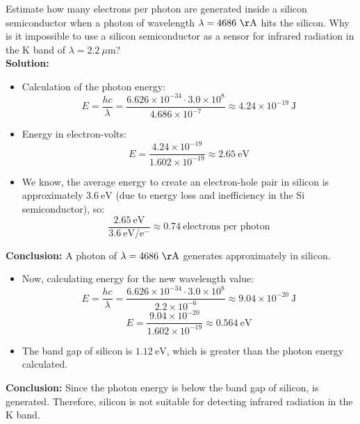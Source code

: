 \documentclass[12pt,a4paper]{article}
\begin{document}
\subsubsection*{}
Estimate how many electrons per photon are generated inside a silicon semiconductor when a photon of wavelength $\lambda = 4686\ \mathrm{\AA}$ hits the silicon. 
Why is it impossible to use a silicon semiconductor as a sensor for infrared radiation in the K band of $\lambda = 2.2\ \mu\mathrm{m}$?
\\ \textbf{Solution:} \\
\begin{itemize}
  
  \item Calculation of the photon energy:
  \[
  E = \frac{hc}{\lambda} = \frac{6.626 \times 10^{-34} \cdot 3.0 \times 10^8}{4.686 \times 10^{-7}} \approx 4.24 \times 10^{-19}\ \mathrm{J}
  \]
  
  \item Energy in electron-volts:
  \[
  E = \frac{4.24 \times 10^{-19}}{1.602 \times 10^{-19}} \approx 2.65\ \mathrm{eV}
  \]
  
  \item We know, the average energy to create an electron-hole pair in silicon is approximately $3.6\ \mathrm{eV}$ (due to energy loss and inefficiency in the Si semiconductor), so:
  \[
  \frac{2.65\ \mathrm{eV}}{3.6\ \mathrm{eV/e^-}} \approx 0.74\ \text{electrons per photon}
  \]
\end{itemize}
\textbf{Conclusion:} A photon of $\lambda = 4686\ \mathrm{\AA}$ generates approximately  in silicon.

\begin{itemize}

  \item Now, calculating energy for the new wavelength value:
  \[
  E = \frac{hc}{\lambda} = \frac{6.626 \times 10^{-34} \cdot 3.0 \times 10^8}{2.2 \times 10^{-6}} \approx 9.04 \times 10^{-20}\ \mathrm{J}
  \]
  \[
  E = \frac{9.04 \times 10^{-20}}{1.602 \times 10^{-19}} \approx 0.564\ \mathrm{eV}
  \]
  \item The band gap of silicon is $1.12\ \mathrm{eV}$, which is greater than the photon energy calculated.
\end{itemize}

\textbf{Conclusion:} Since the photon energy is below the band gap of silicon,  is generated. Therefore, silicon is not suitable for detecting infrared radiation in the K band.

\end{document}
